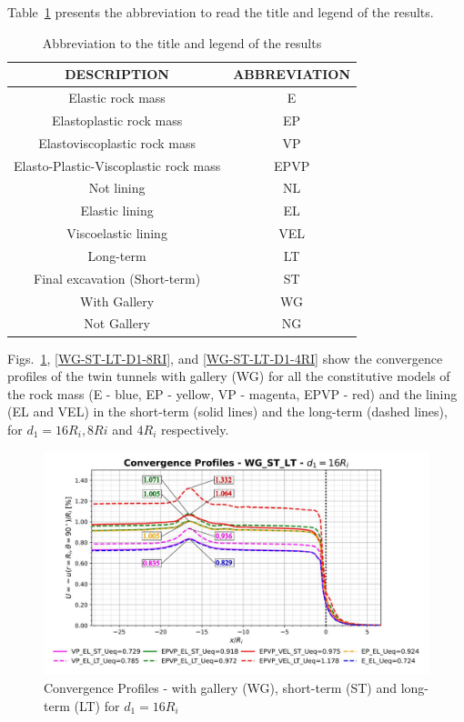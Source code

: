\documentclass[a4paper,fleqn]{cas-sc}
\begin{document}
\FloatBarrier
Table~\ref{table3} presents the abbreviation to read the title and legend of the results.
\begin{table}
	\caption{Abbreviation to the title and legend of the results}
	\label{table3}
	\centering
	\renewcommand{\arraystretch}{1.25}
	\begin{tabular}{c c}
		\hline
		\multicolumn{1}{c}{DESCRIPTION} &
		\multicolumn{1}{c}{ABBREVIATION} \\
		\hline
		Elastic rock mass & E \\
		Elastoplastic rock mass & EP \\
		Elastoviscoplastic rock mass & VP \\
		Elasto-Plastic-Viscoplastic rock mass & EPVP \\
		Not lining & NL \\
		Elastic lining & EL \\
		Viscoelastic lining & VEL \\
		Long-term & LT \\
		Final excavation (Short-term) & ST \\
		With Gallery & WG \\
		Not Gallery & NG \\			
		\hline
	\end{tabular}
	\normalsize
\end{table}
\FloatBarrier
Figs.~\ref{WG-ST-LT-D1-16RI}, \ref{WG-ST-LT-D1-8RI}, and \ref{WG-ST-LT-D1-4RI} show the convergence profiles of the twin tunnels with gallery (WG) for all the constitutive models of the rock mass (E - blue, EP - yellow, VP - magenta, EPVP - red) and the lining (EL and VEL) in the short-term (solid lines) and the long-term (dashed lines), for $d_1 = 16R_i, 8Ri$ and $4R_i$ respectively.
\begin{figure}[h!]
	\centering
	\includegraphics[scale=0.5]{Convergence Profiles - WG_ST_LT - $d_1=16R_i$.pdf}
	\caption{Convergence Profiles - with gallery (WG), short-term (ST) and long-term (LT) for $d_1 = 16R_i$}
	\label{WG-ST-LT-D1-16RI}
\end{figure}
\end{document}
